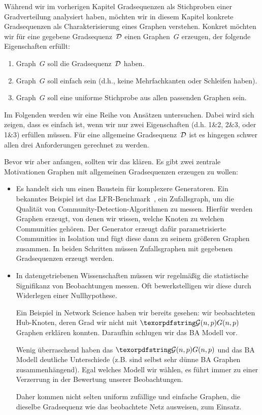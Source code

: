 Während wir im vorherigen Kapitel Gradsequenzen als Stichproben einer Gradverteilung analysiert haben, möchten wir in diesem Kapitel konkrete Gradsequenzen als Charakterisierung eines Graphen verstehen.
Konkret möchten wir für eine gegebene Gradsequenz~$\mathcal{D}$ einen Graphen~$G$ erzeugen, der folgende Eigenschaften erfüllt:
\begin{enumerate}
    \item Graph~$G$ soll die Gradsequenz~$\mathcal{D}$ haben.
    \item Graph~$G$ soll einfach sein (d.h., keine Mehrfachkanten oder Schleifen haben).
    \item Graph~$G$ soll eine uniforme Stichprobe aus allen passenden Graphen sein.
\end{enumerate}

Im Folgenden werden wir eine Reihe von Ansätzen untersuchen.
Dabei wird sich zeigen, dass es einfach ist, wenn wir nur zwei Eigenschaften (d.h. 1\&2, 2\&3, oder 1\&3) erfüllen müssen.
Für eine allgemeine Gradsequenz~$\mathcal{D}$ ist es hingegen schwer allen drei Anforderungen gerechnet zu werden.

Bevor wir aber anfangen, sollten wir das  klären.
Es gibt zwei zentrale Motivationen Graphen mit allgemeinen Gradsequenzen erzeugen zu wollen:
\begin{itemize}
    \item
          Es handelt sich um einen Baustein für komplexere Generatoren.
          Ein bekanntes Beispiel ist das LFR-Benchmark~\cite{lancichinetti2008benchmark}, ein Zufallsgraph, um die Qualität von Community-Detection-Algorithmen zu messen.
          Hierfür werden Graphen erzeugt, von denen wir wissen, welche Knoten zu welchen Communities gehören.
          Der Generator erzeugt dafür parametrisierte Communities in Isolation und fügt diese dann zu seinem größeren Graphen zusammen.
          In beiden Schritten müssen Zufallsgraphen mit gegebenen Gradsequenzen erzeugt werden.

    \item
          In datengetriebenen Wissenschaften müssen wir regelmäßig die statistische Signifikanz von Beobachtungen messen.
          Oft bewerkstelligen wir diese durch Widerlegen einer Nullhypothese.

          Ein Beispiel in Network Science haben wir bereits gesehen:
          wir beobachteten Hub-Knoten, deren Grad wir nicht mit $\Gnp$ Graphen erklären konnten.
          Daraufhin schlugen wir das BA Modell vor.

          Wenig überraschend haben das $\Gnp$ und das BA Modell deutliche Unterschiede (z.B. sind selbst sehr dünne BA Graphen zusammenhängend).
          Egal welches Modell wir wählen, es führt immer zu einer Verzerrung in der Bewertung unserer Beobachtungen.

          Daher kommen nicht selten uniform zufällige und einfache Graphen, die dieselbe Gradsequenz wie das beobachtete Netz ausweisen, zum Einsatz.
\end{itemize}

